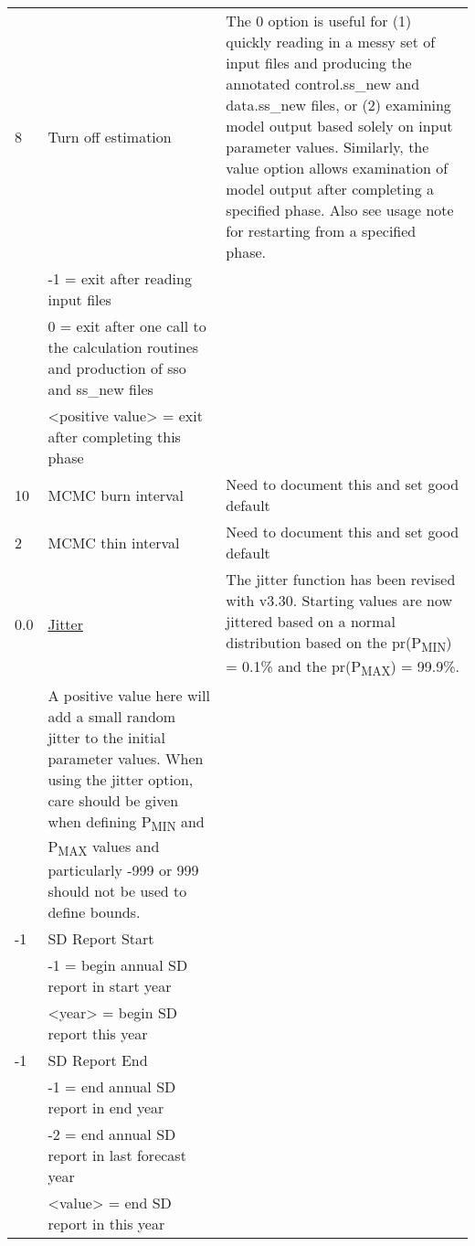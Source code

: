 {\begin{landscape}
\begin{longtable}{p{1.5cm} p{7cm} p{12.5cm}}
 \hline
 8 & Turn off estimation &  \multirow{1}{1cm}[-0.25cm]{\parbox{12.5cm}{The 0 option is useful for (1) quickly reading in a messy set of input files and producing the annotated control.ss\_new and data.ss\_new files, or (2) examining model output based solely on input parameter values.  Similarly, the value option allows examination of model output after completing a specified phase.  Also see usage note for restarting from a specified phase.}}\Tstrut\\
   & -1 = exit after reading input files & \\
   & 0 = exit after one call to the calculation routines and production of sso and ss\_new files & \\
   & <positive value> = exit after completing this phase & \\	  
	     
 \hline
 10 & MCMC burn interval & Need to document this and set good default \Tstrut\\
	   
 \hline
 2 & MCMC thin interval & Need to document this and set good default \Tstrut\\
	   
 \hline 
 0.0 & \hyperlink{Jitter}{Jitter} & \multirow{1}{1cm}[-0.25cm]{\parbox{12.5cm}{The jitter function has been revised with v3.30.  Starting values are now jittered based on a normal distribution based on the pr(P\textsubscript{MIN}) = 0.1\% and the pr(P\textsubscript{MAX}) = 99.9\%.}}\Tstrut\\ 
	 & A positive value here will add a small random jitter to the initial parameter values.  When using the jitter option, care should be given when defining P\textsubscript{MIN} and P\textsubscript{MAX} values and particularly -999 or 999 should not be used to define bounds. & \\
	
 \hline
 -1 & SD Report Start & \Tstrut\\
    & -1 = begin annual SD report in start year & \\
    & <year> = begin SD report this year & \\
	      
 \hline
 -1 & SD Report End & \Tstrut\\
    & -1 = end annual SD report in end year & \\
    & -2 = end annual SD report in last forecast year & \\
    & <value> = end SD report in this year & \\
	   

\end{longtable}
\end{landscape}}
